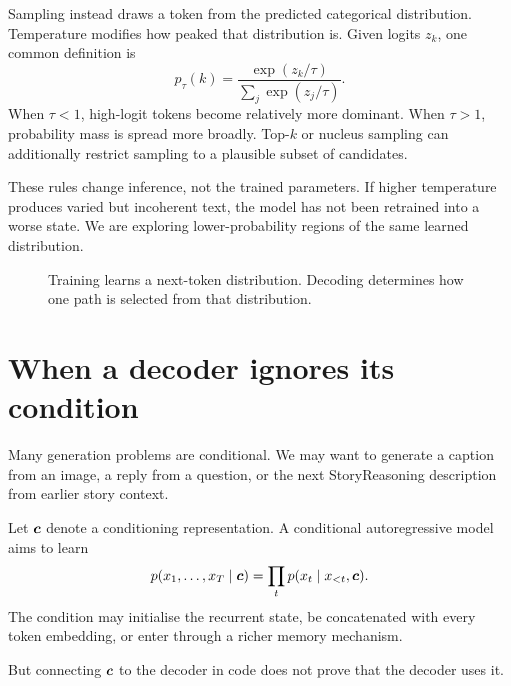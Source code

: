 Sampling instead draws a token from the predicted categorical distribution. Temperature modifies how peaked that distribution is. Given logits \(z_k\), one common definition is
\begin{equation}
  p_\tau(k)
  = \frac{\exp(z_k/\tau)}{\sum_j \exp(z_j/\tau)}.
\end{equation}
When \(\tau<1\), high-logit tokens become relatively more dominant. When \(\tau>1\), probability mass is spread more broadly. Top-\(k\) or nucleus sampling can additionally restrict sampling to a plausible subset of candidates.

These rules change inference, not the trained parameters. If higher temperature produces varied but incoherent text, the model has not been retrained into a worse state. We are exploring lower-probability regions of the same learned distribution.

\begin{figure}[ht]
  \caption{Training learns a next-token distribution. Decoding determines how one path is selected from that distribution.}
  \label{fig:week7-decoding}
\end{figure}

\section{When a decoder ignores its condition}

Many generation problems are conditional. We may want to generate a caption from an image, a reply from a question, or the next StoryReasoning description from earlier story context.

Let \(\bm{c}\) denote a conditioning representation. A conditional autoregressive model aims to learn
\begin{equation}
  p(x_1,\ldots,x_T\mid \bm{c})
  = \prod_t p(x_t\mid x_{<t},\bm{c}).
\end{equation}
The condition may initialise the recurrent state, be concatenated with every token embedding, or enter through a richer memory mechanism.

But connecting \(\bm{c}\) to the decoder in code does not prove that the decoder uses it.

